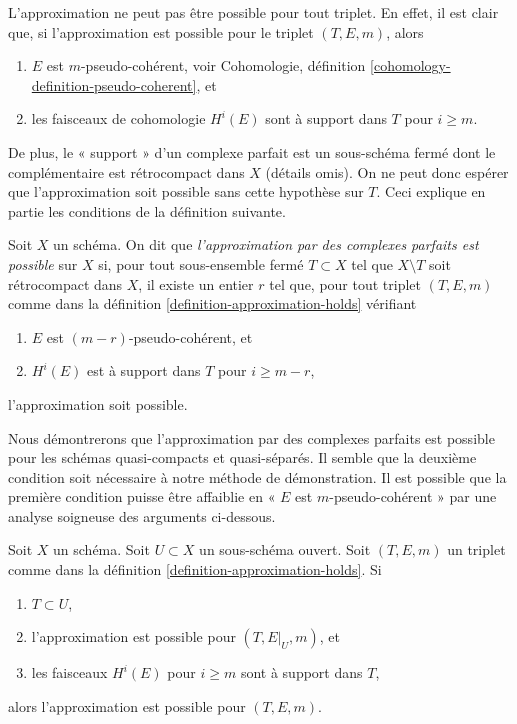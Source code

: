 \noindent
L'approximation ne peut pas être possible pour tout triplet. En effet, il est clair que,
si l'approximation est possible pour le triplet $(T, E, m)$, alors
\begin{enumerate}
\item $E$ est $m$-pseudo-cohérent, voir
Cohomologie, définition \ref{cohomology-definition-pseudo-coherent}, et
\item les faisceaux de cohomologie $H^i(E)$ sont à support dans $T$ pour $i \geq m$.
\end{enumerate}
De plus, le « support » d'un complexe parfait est un sous-schéma fermé
dont le complémentaire est rétrocompact dans $X$ (détails omis). On ne peut donc
espérer que l'approximation soit possible sans cette hypothèse sur $T$.
Ceci explique en partie les conditions de la définition suivante.

\begin{definition}
\label{definition-approximation}
Soit $X$ un schéma. On dit que {\it l'approximation par des complexes parfaits est possible}
sur $X$ si, pour tout sous-ensemble fermé $T \subset X$ tel que $X \setminus T$
soit rétrocompact dans $X$, il existe un entier $r$ tel que,
pour tout triplet $(T, E, m)$ comme dans la
définition \ref{definition-approximation-holds} vérifiant
\begin{enumerate}
\item $E$ est $(m - r)$-pseudo-cohérent, et
\item $H^i(E)$ est à support dans $T$ pour $i \geq m - r$,
\end{enumerate}
l'approximation soit possible.
\end{definition}

\noindent
Nous démontrerons que l'approximation par des complexes parfaits est possible pour les
schémas quasi-compacts et quasi-séparés. Il semble que la deuxième
condition soit nécessaire à notre méthode de démonstration. Il est possible que la
première condition puisse être affaiblie en « $E$ est $m$-pseudo-cohérent »
par une analyse soigneuse des arguments ci-dessous.

\begin{lemma}
\label{lemma-open}
Soit $X$ un schéma. Soit $U \subset X$ un sous-schéma ouvert.
Soit $(T, E, m)$ un triplet comme dans la
définition \ref{definition-approximation-holds}.
Si
\begin{enumerate}
\item $T \subset U$,
\item l'approximation est possible pour $(T, E|_U, m)$, et
\item les faisceaux $H^i(E)$ pour $i \geq m$ sont à support dans $T$,
\end{enumerate}
alors l'approximation est possible pour $(T, E, m)$.
\end{lemma}

